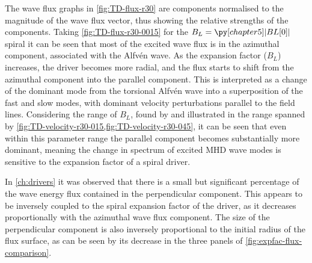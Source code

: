 The wave flux graphs in \cref{fig:TD-flux-r30} are components normalised to the magnitude of the wave flux vector, thus showing the relative strengths of the components.
Taking \cref{fig:TD-flux-r30-0015} for the $B_L=\py[chapter5]|BL[0]|$ spiral it can be seen that most of the excited wave flux is in the azimuthal component, associated with the Alfv\'en wave.
As the expansion factor ($B_L$) increases, the driver becomes more radial, and the flux starts to shift from the azimuthal component into the parallel component.
This is interpreted as a change of the dominant mode from the torsional Alfv\'en wave into a superposition of the fast and slow modes, with dominant velocity perturbations parallel to the field lines.
Considering the range of $B_L$, found by \cite{bonet2008} and illustrated in the range spanned by \cref{fig:TD-velocity-r30-015,fig:TD-velocity-r30-045}, it can be seen that even within this parameter range the parallel component becomes substantially more dominant, meaning the change in spectrum of excited MHD wave modes is sensitive to the expansion factor of a spiral driver.

In \cref{ch:drivers} it was observed that there is a small but significant percentage of the wave energy flux contained in the perpendicular component.
This appears to be inversely coupled to the spiral expansion factor of the driver, as it decreases proportionally with the azimuthal wave flux component.
The size of the perpendicular component is also inversely proportional to the initial radius of the flux surface, as can be seen by its decrease in the three panels of \cref{fig:expfac-flux-comparison}.

